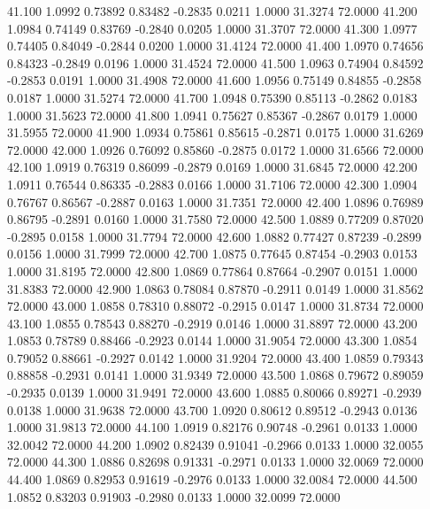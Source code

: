   41.100   1.0992   0.73892   0.83482  -0.2835   0.0211   1.0000  31.3274  72.0000
  41.200   1.0984   0.74149   0.83769  -0.2840   0.0205   1.0000  31.3707  72.0000
  41.300   1.0977   0.74405   0.84049  -0.2844   0.0200   1.0000  31.4124  72.0000
  41.400   1.0970   0.74656   0.84323  -0.2849   0.0196   1.0000  31.4524  72.0000
  41.500   1.0963   0.74904   0.84592  -0.2853   0.0191   1.0000  31.4908  72.0000
  41.600   1.0956   0.75149   0.84855  -0.2858   0.0187   1.0000  31.5274  72.0000
  41.700   1.0948   0.75390   0.85113  -0.2862   0.0183   1.0000  31.5623  72.0000
  41.800   1.0941   0.75627   0.85367  -0.2867   0.0179   1.0000  31.5955  72.0000
  41.900   1.0934   0.75861   0.85615  -0.2871   0.0175   1.0000  31.6269  72.0000
  42.000   1.0926   0.76092   0.85860  -0.2875   0.0172   1.0000  31.6566  72.0000
  42.100   1.0919   0.76319   0.86099  -0.2879   0.0169   1.0000  31.6845  72.0000
  42.200   1.0911   0.76544   0.86335  -0.2883   0.0166   1.0000  31.7106  72.0000
  42.300   1.0904   0.76767   0.86567  -0.2887   0.0163   1.0000  31.7351  72.0000
  42.400   1.0896   0.76989   0.86795  -0.2891   0.0160   1.0000  31.7580  72.0000
  42.500   1.0889   0.77209   0.87020  -0.2895   0.0158   1.0000  31.7794  72.0000
  42.600   1.0882   0.77427   0.87239  -0.2899   0.0156   1.0000  31.7999  72.0000
  42.700   1.0875   0.77645   0.87454  -0.2903   0.0153   1.0000  31.8195  72.0000
  42.800   1.0869   0.77864   0.87664  -0.2907   0.0151   1.0000  31.8383  72.0000
  42.900   1.0863   0.78084   0.87870  -0.2911   0.0149   1.0000  31.8562  72.0000
  43.000   1.0858   0.78310   0.88072  -0.2915   0.0147   1.0000  31.8734  72.0000
  43.100   1.0855   0.78543   0.88270  -0.2919   0.0146   1.0000  31.8897  72.0000
  43.200   1.0853   0.78789   0.88466  -0.2923   0.0144   1.0000  31.9054  72.0000
  43.300   1.0854   0.79052   0.88661  -0.2927   0.0142   1.0000  31.9204  72.0000
  43.400   1.0859   0.79343   0.88858  -0.2931   0.0141   1.0000  31.9349  72.0000
  43.500   1.0868   0.79672   0.89059  -0.2935   0.0139   1.0000  31.9491  72.0000
  43.600   1.0885   0.80066   0.89271  -0.2939   0.0138   1.0000  31.9638  72.0000
  43.700   1.0920   0.80612   0.89512  -0.2943   0.0136   1.0000  31.9813  72.0000
  44.100   1.0919   0.82176   0.90748  -0.2961   0.0133   1.0000  32.0042  72.0000
  44.200   1.0902   0.82439   0.91041  -0.2966   0.0133   1.0000  32.0055  72.0000
  44.300   1.0886   0.82698   0.91331  -0.2971   0.0133   1.0000  32.0069  72.0000
  44.400   1.0869   0.82953   0.91619  -0.2976   0.0133   1.0000  32.0084  72.0000
  44.500   1.0852   0.83203   0.91903  -0.2980   0.0133   1.0000  32.0099  72.0000
